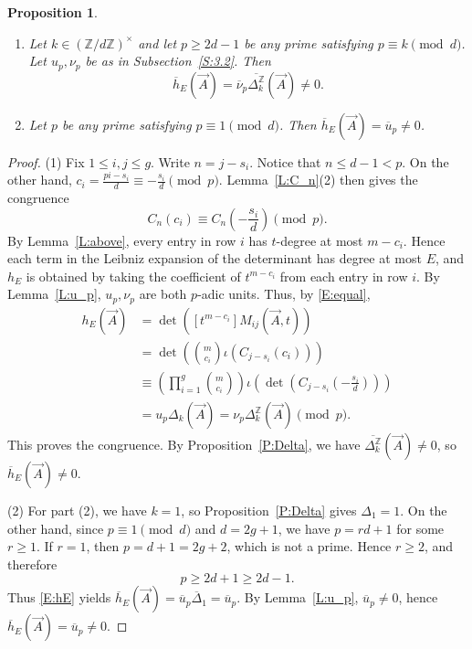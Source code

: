 \documentclass{amsart}
\theoremstyle{plain}
\newtheorem{prop}[theorem]{Proposition}
\theoremstyle{remark}
\renewcommand{\bar}{\overline}
\newcommand{\1}{\mathbf{1}}
\newcommand{\Z}{\mathbb{Z}}
\newcommand{\vA}{{\vec{A}}}
\begin{document}
\begin{prop}\label{P:H}
\leavevmode
\begin{enumerate}
\item
Let $k\in(\Z/d\Z)^\times$ and let $p\ge 2d-1$ be any prime satisfying
$p\equiv k \pmod d$.
Let $u_p,\nu_p$ be as in Subsection~\ref{S:3.2}.
Then
\[
\bar{h}_E(\vA)=\bar{\nu}_p\bar{\Delta_k^\Z}(\vA)\ne 0.
\]
\item
Let $p$ be any prime satisfying $p\equiv 1 \pmod d$.
Then $\bar{h}_E(\vA)=\bar{u}_p\ne 0$.
\end{enumerate}
\end{prop}

\begin{proof}
(1)
Fix $1\le i,j\le g$.
Write $n=j-s_i$.
Notice that $n\le d-1<p$.
On the other hand, $c_i=\frac{pi-s_i}{d}\equiv -\frac{s_i}{d}\pmod p$.
Lemma~\ref{L:C_n}(2) then gives the congruence
\begin{equation}\label{E:equal}
C_n(c_i)\equiv C_n\left(-\frac{s_i}{d}\right)\pmod p.
\end{equation}
By Lemma~\ref{L:above}, every entry in row $i$
has $t$-degree at most $m-c_i$.
Hence each term in the Leibniz expansion of the determinant
has degree at most $E$,
and $h_E$ is obtained by taking the coefficient of $t^{m-c_i}$ from each entry in row $i$.
By Lemma~\ref{L:u_p}, $u_p,\nu_p$ are both $p$-adic units.
Thus, by \eqref{E:equal},
\begin{align}
h_E(\vA)
&=\det\left([t^{m-c_i}]M_{ij}(\vA,t)\right) \nonumber\\
&=\det\left(\binom{m}{c_i}\iota\left(C_{j-s_i}(c_i)\right)\right) \nonumber\\
&\equiv \left(\prod_{i=1}^g \binom{m}{c_i}\right)
\iota\left(\det\left(C_{j-s_i}\left(-\frac{s_i}{d}\right)\right)\right) \nonumber\\
&=u_p\Delta_k(\vA)
=\nu_p\Delta_k^\Z(\vA)\pmod p.\label{E:hE}
\end{align}
This proves the congruence.
By Proposition~\ref{P:Delta}, we have
$\bar{\Delta_k^\Z}(\vA)\ne 0$, so $\bar{h}_E(\vA)\ne 0$.

(2) For part (2), we have $k=1$, so Proposition~\ref{P:Delta} gives
$\Delta_1=1$. On the other hand, since $p\equiv 1\pmod d$ and $d=2g+1$,
we have $p=rd+1$ for some $r \ge 1$. If $r=1$, then
$p=d+1=2g+2$, which is not a prime. Hence $r\ge 2$, and therefore
\[
p\ge 2d+1\ge 2d-1.
\]
Thus \eqref{E:hE} yields
$\bar{h}_E(\vA)= \bar{u}_p\bar\Delta_1=\bar{u}_p$.
By Lemma~\ref{L:u_p}, $\bar{u}_p\ne 0$, hence $\bar{h}_E(\vA)=\bar{u}_p\ne 0$.
\end{proof}
\end{document}
